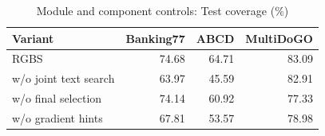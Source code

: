 \begin{table}[!htb]
\caption{Module and component controls: Test coverage (\%)}
\label{tab:rkgb-ablations}
\centering\footnotesize
\setlength{\tabcolsep}{3pt}
\renewcommand{\arraystretch}{1.00}
\begin{tabular*}{\columnwidth}{@{\extracolsep{\fill}}lrrr@{}}
\toprule
Variant & Banking77 & ABCD & MultiDoGO \\
\midrule
RGBS & 74.68 & 64.71 & 83.09 \\
w/o joint text search & 63.97 & 45.59 & 82.91 \\
w/o final selection & 74.14 & 60.92 & 77.33 \\
w/o gradient hints & 67.81 & 53.57 & 78.98 \\
\bottomrule
\end{tabular*}
\end{table}
